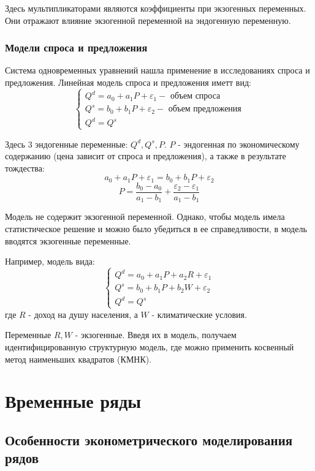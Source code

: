 \documentclass[aps,%
12pt,%
final,%
oneside,
onecolumn,%
musixtex, %
superscriptaddress,%
centertags]{article} %
\theoremstyle{plain}
\theoremstyle{definition}
\theoremstyle{remark}
\begin{document}
Здесь мультипликаторами являются коэффициенты при экзогенных переменных. Они отражают влияние экзогенной переменной
на эндогенную переменную.

\subsubsection{Модели спроса и предложения}

Система одновременных уравнений нашла применение в исследованиях спроса и предложения. Линейная модель спроса и предложения иметт вид:
$$\begin{cases}
	Q^d = a_0 + a_1P + \varepsilon_1 - \text{ объем спроса} \\
	Q^s = b_0 + b_1P + \varepsilon_2 - \text{ объем предложения} \\
	Q^d = Q^s 
\end{cases}$$

Здесь $3$ эндогенные переменные: $Q^d,Q^s, P$. $P$ - эндогенная по экономическому содержанию (цена зависит от спроса и предложения), а также в результате тождества:
$$a_0 + a_1P + \varepsilon_1 = b_0 + b_1P + \varepsilon_2$$
$$P = \frac{b_0-a_0}{a_1-b_1} + \frac{\varepsilon_2- \varepsilon_1}{a_1-b_1}$$

Модель не содержит экзогенной переменной. Однако, чтобы модель имела статистическое решение и можно было убедиться в ее справедливости, в модель вводятся экзогенные переменные.

Например, модель вида:
$$\begin{cases}
	Q^d = a_0 + a_1P + a_2R + \varepsilon_1 \\
	Q^s = b_0 + b_1P + b_2W + \varepsilon_2 \\
	Q^d = Q^s 
\end{cases}$$
где $R$ - доход на душу населения, а $W$ - климатические условия.

Переменные $R,W$ - экзогенные. Введя их в модель, получаем идентифицированную структурную модель, где можно применить косвенный метод наименьших квадратов (КМНК).

\newpage
\section{Временные ряды}

\subsection{Особенности эконометрического моделирования рядов}
\end{document}
